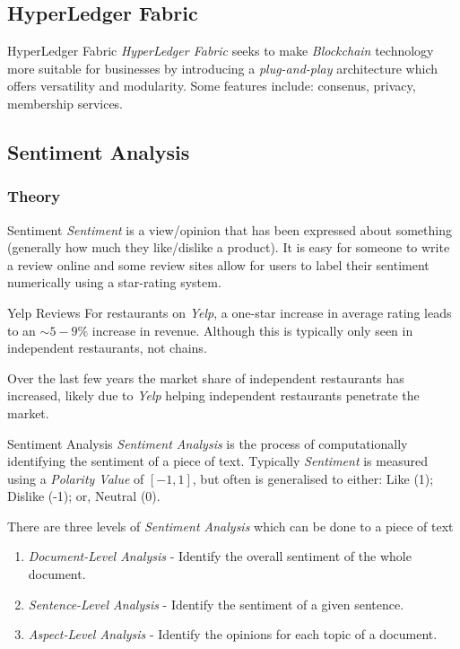 \documentclass[11pt,a4paper]{article}
\begin{document}
\subsection*{HyperLedger Fabric}

  \begin{definition}{HyperLedger Fabric}
    \textit{HyperLedger Fabric} seeks to make \textit{Blockchain} technology more suitable for businesses by introducing a \textit{plug-and-play} architecture which offers versatility and modularity. Some features include: consenus, privacy, membership services.
  \end{definition}

\subsection{Sentiment Analysis} \label{sec_SentimentAnalysis}

\subsubsection{Theory} \label{sec_SentimentAnalysisTheory}

  \begin{definition}{Sentiment}
    \textit{Sentiment} is a view/opinion that has been expressed about something (generally how much they like/dislike a product). It is easy for someone to write a review online and some review sites allow for users to label their sentiment numerically using a star-rating system.
  \end{definition}

  \begin{remark}{Yelp Reviews}
    For restaurants on \textit{Yelp}, a one-star increase in average rating leads to an $\sim5-9\%$ increase in revenue. Although this is typically only seen in independent restaurants, not chains.
    \par Over the last few years the market share of independent restaurants has increased, likely due to \textit{Yelp} helping independent restaurants penetrate the market.
  \end{remark}

  \begin{definition}{Sentiment Analysis}
    \textit{Sentiment Analysis} is the process of computationally identifying the sentiment of a piece of text. Typically \textit{Sentiment} is measured using a \textit{Polarity Value} of $[-1,1]$, but often is generalised to either: Like (1); Dislike (-1); or, Neutral (0).
    \par There are three levels of \textit{Sentiment Analysis} which can be done to a piece of text
    \begin{enumerate}
      \item \textit{Document-Level Analysis} - Identify the overall sentiment of the whole document.
      \item \textit{Sentence-Level Analysis} - Identify the sentiment of a given sentence.
      \item \textit{Aspect-Level Analysis} - Identify the opinions for each topic of a document.
    \end{enumerate}
  \end{definition}
\end{document}

